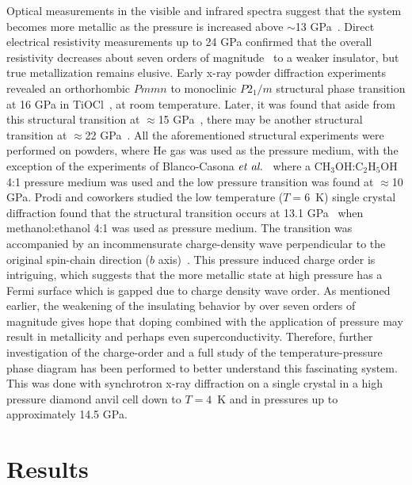 \documentclass[preprint,superscriptaddress,amsmath,amssymb,aps,prl]{revtex4-1}
\begin{document}
Optical measurements in the visible and infrared spectra suggest that the system becomes more metallic as the pressure is increased above $\sim$13 GPa~\cite{Kuntscher2006,Kuntscher2007,Kuntscher2008,Kuntscher2010}. Direct electrical resistivity measurements up to 24 GPa confirmed that the overall resistivity decreases about seven orders of magnitude~\cite{Forthaus2008} to a weaker insulator, but true metallization remains elusive. Early x-ray powder diffraction experiments revealed an orthorhombic $Pmmn$ to monoclinic $P2_{1}/m$ structural phase transition at 16 GPa in TiOCl~\cite{Kuntscher2008}, at room temperature. Later, it was found that aside from this structural transition at $\approx$15 GPa~\cite{Ebad2010,Kuntscher2010}, there may be another structural transition at $\approx$22 GPa~\cite{Ebad2010,Kuntscher2010}. All the aforementioned structural experiments were performed on powders, where He gas was used as the pressure medium, with the exception of the experiments of Blanco-Casona $\emph{et al.}$~\cite{Blanco2009} where a CH$_{3}$OH:C$_{2}$H$_{5}$OH 4:1 pressure medium was used and the low pressure transition was found at $\approx$10 GPa. Prodi and coworkers studied the low temperature ($T=6$~K) single crystal diffraction found that the structural transition occurs at 13.1 GPa~\cite{Prodi2010} when methanol:ethanol 4:1 was used as pressure medium. The transition was accompanied by an incommensurate charge-density wave perpendicular to the original spin-chain direction ($b$ axis)~\cite{Prodi2010}. This pressure induced charge order is intriguing, which suggests that the more metallic state at high pressure has a Fermi surface which is gapped due to charge density wave order. As mentioned earlier, the weakening of the insulating behavior by over seven orders of magnitude gives hope that doping combined with the application of pressure may result in metallicity and perhaps even superconductivity. Therefore, further investigation of the charge-order and a full study of the temperature-pressure phase diagram has been performed to better understand this fascinating system. This was done with synchrotron x-ray diffraction on a single crystal in a high pressure diamond anvil cell down to $T=4$~K and in pressures up to approximately 14.5 GPa.

\section*{Results}
\end{document}

